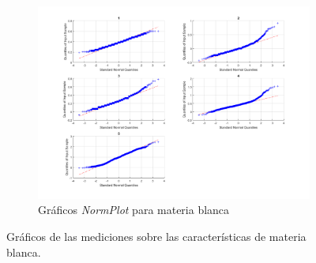 \documentclass[11pt]{article} %
\begin{document}
\begin{figure}[h]
\begin{subfigure}[b]{0.475 \textwidth}
		\includegraphics[width = \textwidth]{./23/2_blanca/plotnorm.png}
		\caption{Gráficos \emph{NormPlot} para materia blanca}
		\label{fig:23:white:normplot}
	\end{subfigure}
	\caption{Gráficos de las mediciones sobre las características de materia blanca.}
	\label{fig:23:white}
\end{figure}
\end{document}
